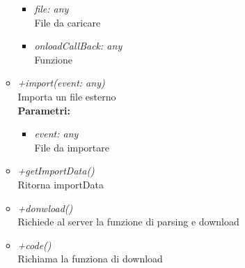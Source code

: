 \begin{itemize}
\begin{itemize}
\begin{itemize}
    			\item \emph{file: any}\\
    			File da caricare
    			\item \emph{onloadCallBack: any}\\
    			Funzione
    		\end{itemize}
    		\item \emph{+import(event: any)}\\
    		Importa un file esterno\\
    		\textbf{Parametri:}
    		\begin{itemize}
    			\item \emph{event: any}\\
    			File da importare
    		\end{itemize}
    		\item \emph{+getImportData()}\\
    		Ritorna importData
    		\item \emph{+donwload()}\\
    		Richiede al server la funzione di parsing e download
    		\item \emph{+code()}\\
    		Richiama la funziona di download
		\end{itemize}
\end{itemize}
